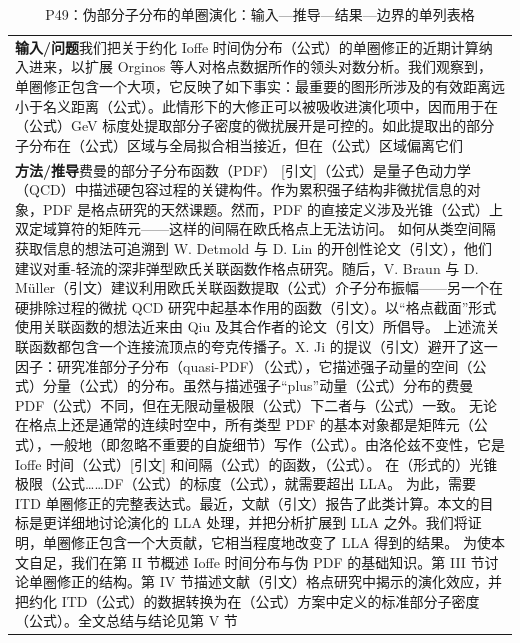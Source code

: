 \documentclass[UTF8,11pt,oneside]{ctexbook}
\begin{document}
\begin{table}[htbp]
  \centering
  \caption*{P49：伪部分子分布的单圈演化：输入—推导—结果—边界的单列表格}
  \small
  \begin{tabular}{@{}p{}@{}}
    \toprule
    \textbf{输入/问题}\quad 我们把关于约化 Ioffe 时间伪分布（公式）的单圈修正的近期计算纳入进来，以扩展 Orginos 等人对格点数据所作的领头对数分析。我们观察到，单圈修正包含一个大项，它反映了如下事实：最重要的图形所涉及的有效距离远小于名义距离（公式）。此情形下的大修正可以被吸收进演化项中，因而用于在（公式）GeV 标度处提取部分子密度的微扰展开是可控的。如此提取出的部分子分布在（公式）区域与全局拟合相当接近，但在（公式）区域偏离它们 \\
    \textbf{方法/推导}\quad 费曼的部分子分布函数（PDF） [引文]（公式）是量子色动力学（QCD）中描述硬包容过程的关键构件。作为累积强子结构非微扰信息的对象，PDF 是格点研究的天然课题。然而，PDF 的直接定义涉及光锥（公式）上双定域算符的矩阵元——这样的间隔在欧氏格点上无法访问。 如何从类空间隔获取信息的想法可追溯到 W. Detmold 与 D. Lin 的开创性论文（引文），他们建议对重-轻流的深非弹型欧氏关联函数作格点研究。随后，V. Braun 与 D. Müller（引文）建议利用欧氏关联函数提取（公式）介子分布振幅——另一个在硬排除过程的微扰 QCD 研究中起基本作用的函数（引文）。以``格点截面''形式使用关联函数的想法近来由 Qiu 及其合作者的论文（引文）所倡导。 上述流关联函数都包含一个连接流顶点的夸克传播子。X. Ji 的提议（引文）避开了这一因子：研究准部分子分布（quasi-PDF）（公式），它描述强子动量的空间（公式）分量（公式）的分布。虽然与描述强子``plus''动量（公式）分布的费曼 PDF（公式）不同，但在无限动量极限（公式）下二者与（公式）一致。 无论在格点上还是通常的连续时空中，所有类型 PDF 的基本对象都是矩阵元（公式），一般地（即忽略不重要的自旋细节）写作（公式）。由洛伦兹不变性，它是 Ioffe 时间（公式）[引文] 和间隔（公式）的函数，（公式）。 在（形式的）光锥极限（公式……DF（公式）的标度（公式），就需要超出 LLA。 为此，需要 ITD 单圈修正的完整表达式。最近，文献（引文）报告了此类计算。本文的目标是更详细地讨论演化的 LLA 处理，并把分析扩展到 LLA 之外。我们将证明，单圈修正包含一个大贡献，它相当程度地改变了 LLA 得到的结果。 为使本文自足，我们在第 II 节概述 Ioffe 时间分布与伪 PDF 的基础知识。第 III 节讨论单圈修正的结构。第 IV 节描述文献（引文）格点研究中揭示的演化效应，并把约化 ITD（公式）的数据转换为在（公式）方案中定义的标准部分子密度（公式）。全文总结与结论见第 V 节 \\

\end{tabular}
\end{table}
\end{document}
